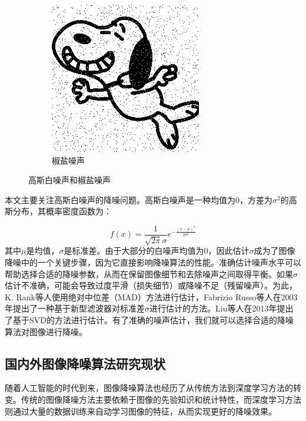 \documentclass[12pt]{article}
\begin{document}
\begin{figure}[H]
\begin{subfigure}[b]{0.45\textwidth}
        \includegraphics[width=\textwidth]{images/salt_pepper_noise.png}
        \caption{椒盐噪声}
    \end{subfigure}
    \caption{高斯白噪声和椒盐噪声}
    \label{fig:noise_types}
\end{figure}

本文主要关注高斯白噪声的降噪问题。高斯白噪声是一种均值为0，方差为$\sigma^2$的高斯分布，其概率密度函数为：

\begin{equation}
    f(x)=\frac{1}{\sqrt{2\pi}\sigma}e^{-\frac{(x - \mu)^{2}}{2\sigma^{2}}}
\end{equation}
其中$\mu$是均值，$\sigma$是标准差。由于大部分的白噪声均值为0，因此估计$\sigma$成为了图像降噪中的一个关键步骤，因为它直接影响降噪算法的性能。准确估计噪声水平可以帮助选择合适的降噪参数，从而在保留图像细节和去除噪声之间取得平衡。如果$\sigma$估计不准确，可能会导致过度平滑（损失细节）或降噪不足（残留噪声）\cite{Estimation_of_noise_variance}。为此，K. Rank等人\cite{MADestimate}使用绝对中位差（MAD）方法进行估计，Fabrizio Russo等人\cite{AWGN}在2003年提出了一种基于新型滤波器对标准差$\sigma$进行估计的方法。Liu等人在2013年提出了基于SVD的方法\cite{SVDWhiteNoise}进行估计。有了准确的噪声估计，我们就可以选择合适的降噪算法对图像进行降噪。

\subsection{国内外图像降噪算法研究现状}
随着人工智能的时代到来，图像降噪算法也经历了从传统方法到深度学习方法的转变。传统的图像降噪方法主要依赖于图像的先验知识和统计特性，而深度学习方法则通过大量的数据训练来自动学习图像的特征，从而实现更好的降噪效果。
\end{document}
